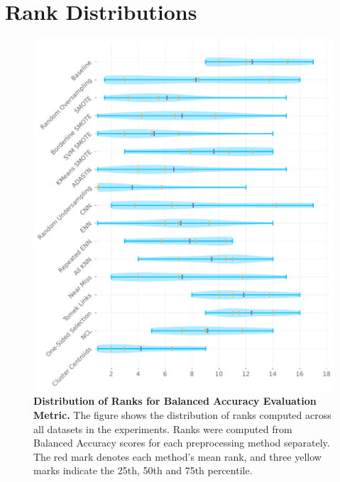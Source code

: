\chapter{Rank Distributions}
\label{appendix:distributions}

\begin{figure}
    \centering
    \includegraphics[width=\linewidth]{figures/balanced_accuracy_ranks_distribution.pdf}
    \caption{
        \textbf{Distribution of Ranks for Balanced Accuracy Evaluation Metric.} The figure shows the
        distribution of ranks computed across all datasets in the experiments. Ranks were computed
        from Balanced Accuracy scores for each preprocessing method separately. The red mark
        denotes each method’s mean rank, and three yellow marks indicate the 25th, 50th and 75th
        percentile.
    }
    \label{figure:balanced_accuracy_rank_distributions}
\end{figure}

